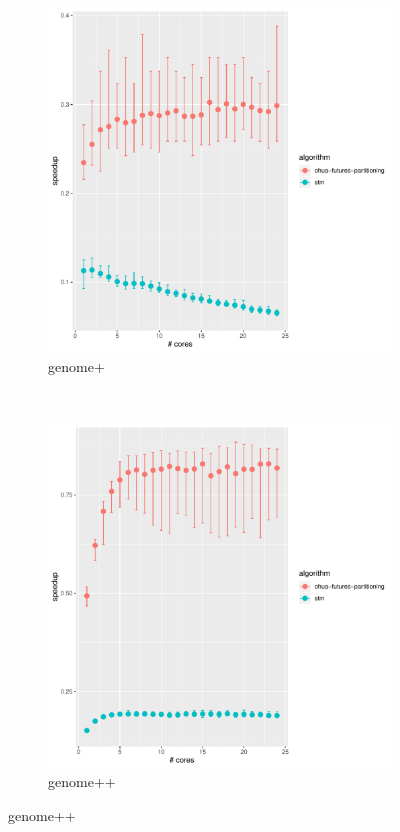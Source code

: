 \begin{figure}
\begin{subfigure}[t]{.32\textwidth}
        \includegraphics[width=\textwidth,keepaspectratio]{gfx/results/genome/genome+}
        \caption{genome+}%
    \end{subfigure}%
    ~
    \begin{subfigure}[t]{.32\textwidth}
        \includegraphics[width=\textwidth,keepaspectratio]{gfx/results/genome/genome++}
        \caption{genome++}%
    \end{subfigure}%


\end{figure}
